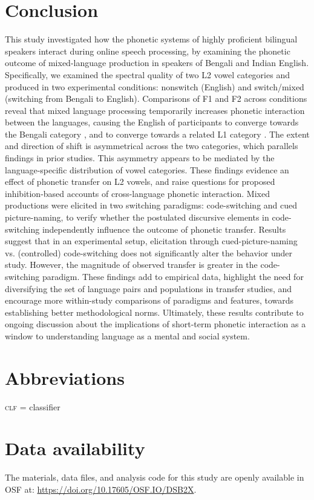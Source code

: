 \documentclass[12 pt]{article}
\newcommand{\nt}[1]{\textipa{[#1]}} %
\begin{document}
\section{Conclusion}
This study investigated how the phonetic systems of highly proficient bilingual speakers interact during online speech processing, by examining the phonetic outcome of mixed-language production in speakers of Bengali and Indian English. Specifically, we examined the spectral quality of two L2 vowel categories \nt{2} and \nt{\ae} produced in two experimental conditions: nonswitch (English) and switch/mixed (switching from Bengali to English).
Comparisons of F1 and F2 across conditions reveal that mixed language processing temporarily increases phonetic interaction between the languages, causing the English \nt{\ae} of participants to converge towards the Bengali category \nt{\ae}, and \nt{2} to converge towards a related L1 category \nt{a:}. The extent and direction of shift is asymmetrical across the two categories, which parallels findings in prior studies. This asymmetry appears to be mediated by the language-specific distribution of vowel categories. These findings evidence an effect of phonetic transfer on L2 vowels, and raise questions for proposed inhibition-based accounts of cross-language phonetic interaction. Mixed productions were elicited in two switching paradigms: code-switching and cued picture-naming, to verify whether the postulated discursive elements in code-switching independently influence the outcome of phonetic transfer. Results suggest that in an experimental setup, elicitation through cued-picture-naming vs. (controlled) code-switching does not significantly alter the behavior under study. However, the magnitude of observed transfer is greater in the code-switching paradigm. These findings add to empirical data, highlight the need for diversifying the set of language pairs and populations in transfer studies, and encourage more within-study comparisons of paradigms and features, towards establishing better methodological norms. Ultimately, these results contribute to ongoing discussion about the implications of short-term phonetic interaction as a window to understanding language as a mental and social system.

\section*{Abbreviations}
\textsc{clf} = classifier

\section*{Data availability} \label{data_availability}
The materials, data files, and analysis code for this study are openly available in OSF at:  \url{https://doi.org/10.17605/OSF.IO/DSB2X}.
\end{document}
